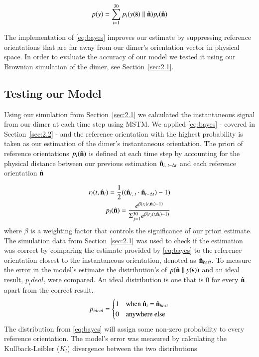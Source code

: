 \documentclass[final, 3p]{elsarticle}
\begin{document}
\begin{align}
	p(y) = \sum\limits_{i=1}^{30} p_i(y(\bar{\bf s})\parallel\hat{\bf n})p_i(\hat{\bf n})
 \end{align}

The implementation of \eqref{eq:bayes} improves our estimate by suppressing reference orientations that are far away from our dimer's orientation vector in physical space. In order to evaluate the accuracy of our model we tested it using our Brownian simulation of the dimer, see Section~\ref{sec:2.1}.

\subsection{Testing our Model}
\label{sec:2.3}
Using our simulation from Section~\ref{sec:2.1} we calculated the instantaneous signal from our dimer at each time step using MSTM.  We applied \eqref{eq:bayes} - covered in Section~\ref{sec:2.2} - and the reference orientation with the highest probability is taken as our estimation of the dimer's instantaneous orientation. The priori of reference orientations $p_i(\hat{\bf n})$ is defined at each time step by accounting for the physical distance between our previous estimation $\hat{\bf n}_{i, \ t - \Delta t}$ and each reference orientation $\hat{\bf n}$ 

\begin{align}
	r_i(t, \hat{\bf n}_i)= \frac{1}{2}((\hat{\bf n}_{i,\ t} \cdot \hat{\bf n}_{t-\Delta t})-1) \\
	p_i(\hat{\bf n})= \frac{e^{\beta (r_i(t,\hat{\bf n}_i)-1)}}
	{\Sigma_{j=1}^{30}e^{\beta(r_j(t, \hat{\bf n}_i)-1)}}
\end{align}
where $\beta$ is a weighting factor that controls the significance of
our priori estimate. The simulation data from Section~\ref{sec:2.1}
was used to check if the estimation was correct by comparing the
estimate provided by \eqref{eq:bayes} to the reference orientation
closest to the instantaneous orientation, denoted as
$\hat{\bf n}_{best}$.  To measure the error in the model's estimate the
distribution's of $p(\hat{\bf n}\parallel y(\bar{\bf s}))$ and an ideal
result, $p_ideal$, were compared. An ideal distribution is one that is
0 for every $\hat{\bf n}$ apart from the correct result.
\begin{align}
	p_{ideal} = 
	\begin{cases}
		1 & \text{when $\hat{\bf n}_i$ = $\hat{\bf n}_{best}$}\\
		0 & \text{anywhere else}
	\end{cases}
\end{align}
The distribution from \eqref{eq:bayes} will assign some non-zero probability to every reference orientation.  The model's error was measured by calculating the Kullback-Leibler ($K_l$) divergence between the two distributions 
\end{document}
